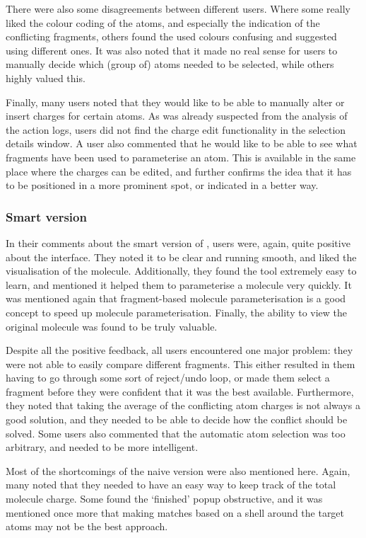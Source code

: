 There were also some disagreements between different users. Where some really liked the colour coding of the atoms, and especially the indication of the conflicting fragments, others found the used colours confusing and suggested using different ones. It was also noted that it made no real sense for users to manually decide which (group of) atoms needed to be selected, while others highly valued this.

Finally, many users noted that they would like to be able to manually alter or insert charges for certain atoms. As was already suspected from the analysis of the action logs, users did not find the charge edit functionality in the selection details window. A user also commented that he would like to be able to see what fragments have been  used to parameterise an atom. This is available in the same place where the charges can be edited, and further confirms the idea that it has to be positioned in a more prominent spot, or indicated in a better way.


\subsubsection{Smart version}
In their comments about the smart version of \oframp, users were, again, quite positive about the interface. They noted it to be clear and running smooth, and liked the visualisation of the molecule. Additionally, they found the tool extremely easy to learn, and mentioned it helped them to parameterise a molecule very quickly. It was mentioned again that fragment-based molecule parameterisation is a good concept to speed up molecule parameterisation. Finally, the ability to view the original molecule was found to be truly valuable.

Despite all the positive feedback, all users encountered one major problem: they were not able to easily compare different fragments. This either resulted in them having to go through some sort of reject/undo loop, or made them select a fragment before they were confident that it was the best available. Furthermore, they noted that taking the average of the conflicting atom charges is not always a good solution, and they needed to be able to decide how the conflict should be solved. Some users also commented that the automatic atom selection was too arbitrary, and needed to be more intelligent.

Most of the shortcomings of the naive version were also mentioned here. Again, many noted that they needed to have an easy way to keep track of the total molecule charge. Some found the `finished' popup obstructive, and it was mentioned once more that making matches based on a shell around the target atoms may not be the best approach.

